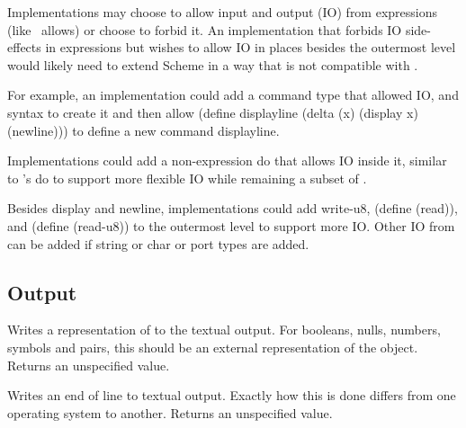 \begin{rationale}
  Implementations may choose to allow input and output (IO) from
  expressions (like \rsevenrs\ allows) or choose to forbid it.  An
  implementation that forbids IO side-effects in expressions but
  wishes to allow IO in places besides the outermost level would
  likely need to extend Scheme in a way that is not compatible with
  \rsevenrs.

  For example, an implementation could add a command type that allowed
  IO, and syntax to create it and then allow {\cf (define displayline
    (delta (x) (display x) (newline)))} to define a new command {\cf
    displayline}.

  Implementations could add a non-expression {\cf do} that allows
  IO inside it, similar to \rsevenrs's {\cf do} to support more
  flexible IO while remaining a subset of \rsevenrs.

  Besides {\cf display} and {\cf newline}, implementations could add
  {\cf write-u8}, {\cf (define}  {\cf (read))}, and
  {\cf (define}  {\cf (read-u8))} to the outermost
  level to support more IO. Other IO from \rsevenrs{} can be added if
  string or char or port types are added.
\end{rationale}

\subsection{Output}
\label{outputsection}

\begin{entry}{%
}

Writes a representation of  to the textual output.
For booleans, nulls, numbers, symbols and pairs, this should
be an external representation of the object.
Returns an unspecified value.

\end{entry}

\begin{entry}{%
}

Writes an end of line to textual output.  Exactly how this
is done differs
from one operating system to another. Returns an unspecified value.

\end{entry}
